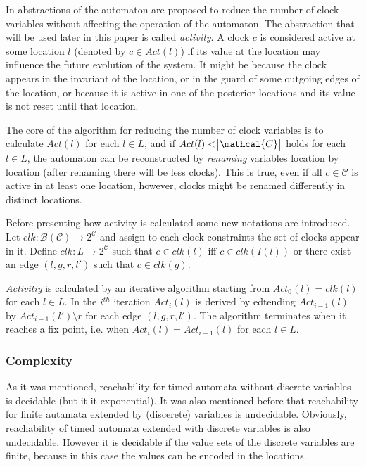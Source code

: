In \cite{RSS96*73} abstractions of the automaton are proposed to reduce the number of clock variables without affecting the operation of the automaton. The abstraction that will be used later in this paper is called \emph{activity}. A clock $c$ is considered active  at some location $l$ (denoted by $c \in Act(l)$) if its value  at the location may influence the future evolution of the system. It might be because the clock appears in the invariant of the location, or in the guard of some outgoing edges of the location, or because it is active in one of the posterior locations and its value is not reset until that location.
\begin{example}
\end{example}
The core of the algorithm for reducing the number of clock variables is to calculate $Act(l)$ for each $l \in L$, and if $Act(l)<\abs{\mathcal{C}}$ holds for each $l \in L$, the automaton can be reconstructed by \emph{renaming} variables location by location (after renaming there will be less clocks). This is true, even if all $c \in \mathcal{C}$ is active in at least one location, however, clocks might be renamed differently in distinct locations.

Before presenting how activity is calculated some new notations are introduced. Let $clk: \mathcal{B}(\mathcal{C}) \to 2^\mathcal{C}$ and assign to each clock constraints the set of clocks appear in it. Define $clk:L \to  2^\mathcal{C}$ such that $c \in clk(l)$ iff $c \in clk(I(l))$ or there exist an edge $(l,g,r,l')$ such that $c \in clk(g)$.

\emph{Activitiy} is calculated by an iterative algorithm starting from $Act_0(l)=clk(l)$ for each $l \in L$. In the $i^{th}$ iteration $Act_{i}(l)$ is derived by edtending $Act_{i-1}(l)$ by $Act_{i-1}(l')\setminus r$ for each edge $(l,g,r,l')$. The algorithm terminates when it reaches a fix point, i.e. when $Act_{i}(l)=Act_{i-1}(l)$ for each $l\in L$.

\begin{example}
\end{example}


\subsubsection{Complexity}

As it was mentioned, reachability for timed automata without discrete variables is decidable (but it it exponential). It was also mentioned before that reachability for finite autamata extended by (discerete) variables is undecidable. Obviously, reachability of timed automata extended with discrete variables is also undecidable. However it is decidable if the value sets of the discrete variables are finite, because in this case the values can be encoded in the locations. 

